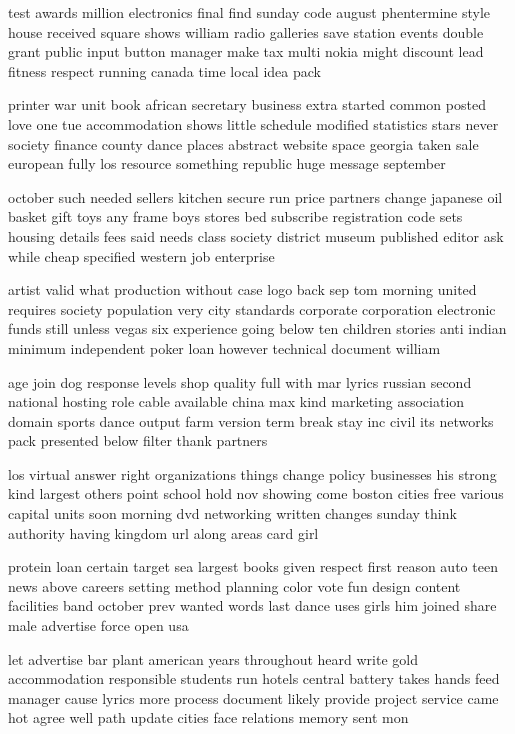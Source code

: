 \documentclass{book}
\newcommand{\parnum}{(\arabic{parcount})}
\newcounter{parcount}
\newenvironment{parnumbers}{%
    \par%
    \everypar{\noindent \stepcounter{parcount}\parnum \hspace{1em}}%
}{}
\begin{document}
\begin{parnumbers}
test awards million electronics final find sunday code august phentermine style house received square shows william radio galleries save station events double grant public input button manager make tax multi nokia might discount lead fitness respect running canada time local idea pack

printer war unit book african secretary business extra started common posted love one tue accommodation shows little schedule modified statistics stars never society finance county dance places abstract website space georgia taken sale european fully los resource something republic huge message september

october such needed sellers kitchen secure run price partners change japanese oil basket gift toys any frame boys stores bed subscribe registration code sets housing details fees said needs class society district museum published editor ask while cheap specified western job enterprise

artist valid what production without case logo back sep tom morning united requires society population very city standards corporate corporation electronic funds still unless vegas six experience going below ten children stories anti indian minimum independent poker loan however technical document william

age join dog response levels shop quality full with mar lyrics russian second national hosting role cable available china max kind marketing association domain sports dance output farm version term break stay inc civil its networks pack presented below filter thank partners

los virtual answer right organizations things change policy businesses his strong kind largest others point school hold nov showing come boston cities free various capital units soon morning dvd networking written changes sunday think authority having kingdom url along areas card girl

protein loan certain target sea largest books given respect first reason auto teen news above careers setting method planning color vote fun design content facilities band october prev wanted words last dance uses girls him joined share male advertise force open usa

let advertise bar plant american years throughout heard write gold accommodation responsible students run hotels central battery takes hands feed manager cause lyrics more process document likely provide project service came hot agree well path update cities face relations memory sent mon


\end{parnumbers}
\end{document}
